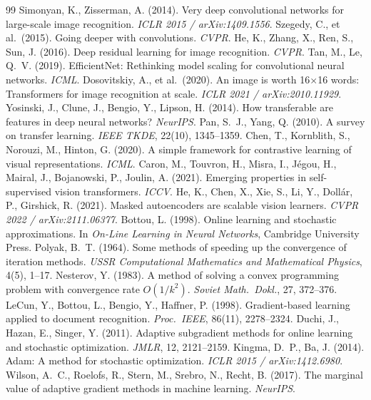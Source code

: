 \documentclass[10pt,letterpaper]{article}
\begin{document}
\begin{thebibliography}{99}
 Simonyan, K., Zisserman, A. (2014). Very deep convolutional networks for large-scale image recognition. \emph{ICLR 2015 / arXiv:1409.1556}.
 Szegedy, C., et al.\ (2015). Going deeper with convolutions. \emph{CVPR}.
 He, K., Zhang, X., Ren, S., Sun, J. (2016). Deep residual learning for image recognition. \emph{CVPR}.
 Tan, M., Le, Q.~V. (2019). EfficientNet: Rethinking model scaling for convolutional neural networks. \emph{ICML}.
 Dosovitskiy, A., et al.\ (2020). An image is worth 16$\times$16 words: Transformers for image recognition at scale. \emph{ICLR 2021 / arXiv:2010.11929}.
 Yosinski, J., Clune, J., Bengio, Y., Lipson, H. (2014). How transferable are features in deep neural networks? \emph{NeurIPS}.
 Pan, S.~J., Yang, Q. (2010). A survey on transfer learning. \emph{IEEE TKDE}, 22(10), 1345--1359.
 Chen, T., Kornblith, S., Norouzi, M., Hinton, G. (2020). A simple framework for contrastive learning of visual representations. \emph{ICML}.
 Caron, M., Touvron, H., Misra, I., J\'{e}gou, H., Mairal, J., Bojanowski, P., Joulin, A. (2021). Emerging properties in self-supervised vision transformers. \emph{ICCV}.
 He, K., Chen, X., Xie, S., Li, Y., Doll\'{a}r, P., Girshick, R. (2021). Masked autoencoders are scalable vision learners. \emph{CVPR 2022 / arXiv:2111.06377}.
 Bottou, L. (1998). Online learning and stochastic approximations. In \emph{On-Line Learning in Neural Networks}, Cambridge University Press.
 Polyak, B.~T. (1964). Some methods of speeding up the convergence of iteration methods. \emph{USSR Computational Mathematics and Mathematical Physics}, 4(5), 1--17.
 Nesterov, Y. (1983). A method of solving a convex programming problem with convergence rate $O(1/k^2)$. \emph{Soviet Math.\ Dokl.}, 27, 372--376.
 LeCun, Y., Bottou, L., Bengio, Y., Haffner, P. (1998). Gradient-based learning applied to document recognition. \emph{Proc.\ IEEE}, 86(11), 2278--2324.
 Duchi, J., Hazan, E., Singer, Y. (2011). Adaptive subgradient methods for online learning and stochastic optimization. \emph{JMLR}, 12, 2121--2159.
 Kingma, D.~P., Ba, J. (2014). Adam: A method for stochastic optimization. \emph{ICLR 2015 / arXiv:1412.6980}.
 Wilson, A.~C., Roelofs, R., Stern, M., Srebro, N., Recht, B. (2017). The marginal value of adaptive gradient methods in machine learning. \emph{NeurIPS}.

\end{thebibliography}
\end{document}
